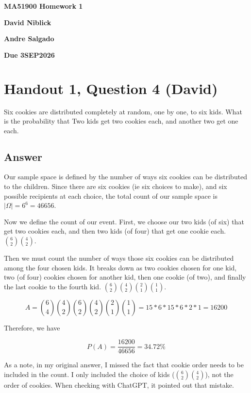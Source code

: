 \documentclass[11pt]{article}
\begin{document}
\begin{center}
    {\Large\bfseries MA51900 Homework 1}

    {\Large\bfseries David Niblick}

    {\Large\bfseries Andre Salgado}
    
    {\Large\bfseries Due 3SEP2026}
\end{center}

\section*{Handout 1, Question 4 (David)}

Six cookies are distributed completely at random, one by one,
to six kids.
What is the probability that
Two kids get two cookies each, and another two get one each.

\subsection*{Answer}

Our sample space is defined by the number of ways six cookies can be distributed to 
the children.
Since there are six cookies (ie six choices to make), and six possible recipients at 
each choice, the total count of our sample space is \(\left|\Omega\right|=6^6 = 46656\).

Now we define the count of our event.
First, we choose our two kids (of six) that get two cookies each, and then two kids (of four) that get one cookie each.
\(\binom{6}{2} \binom{4}{2}\).

Then we must count the number of ways those six cookies can be distributed among the four chosen kids.
It breaks down as 
two cookies chosen for one kid, two (of four) cookies chosen for another kid, then one cookie (of two), 
and finally the last cookie to the fourth kid. 
\(\binom{6}{2} \binom{4}{2} \binom{2}{1} \binom{1}{1}\).



\[
A = \binom{6}{4} \binom{4}{2} \binom{6}{2} \binom{4}{2} \binom{2}{1} \binom{1}{1}
= 15 * 6 * 15 * 6 * 2 * 1 = 16200
\]

Therefore, we have 

\[
P(A) = \frac{16200}{46656} = 34.72\%
\]


As a note, in my original answer, I missed the fact that cookie order needs to be included in the count.
I only included the choice of kids (\(\binom{6}{2} \binom{4}{2}\)), not the order of cookies.
When checking with ChatGPT, it pointed out that mistake.
\end{document}
